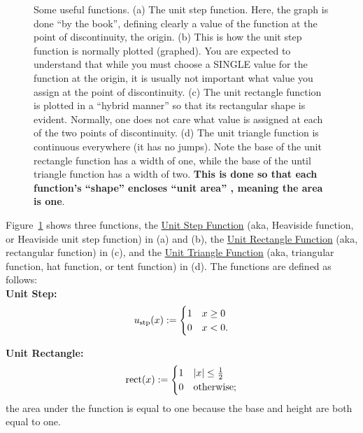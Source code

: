 \begin{figure}[htb!]
\caption[]{Some useful functions. (a) The unit step function. Here, the graph is done ``by the book'', defining clearly a value of the function at the point of discontinuity, the origin. (b) This is how the unit step function is normally plotted (graphed). You are expected to understand that while you must choose a SINGLE value for the function at the origin, it is usually not important what value you assign at the point of discontinuity. (c) The unit rectangle function is plotted in a ``hybrid manner'' so that its rectangular shape is evident. Normally, one does not care what value is assigned at each of the two points of discontinuity. (d) The unit triangle function is continuous everywhere (it has no jumps). Note the base of the unit rectangle function has a width of one, while the base of the until triangle function has a width of two. \textbf{This is done so that each function's ``shape'' encloses ``unit area'' , meaning the area is one}. }
    \label{fig:SpecialFunctions}
\end{figure}

Figure~\ref{fig:SpecialFunctions} shows three functions, the \href{https://en.wikipedia.org/wiki/Heaviside_step_function}{Unit Step Function} (aka, Heaviside function, or Heaviside unit step function) in (a) and (b), the \href{https://en.wikipedia.org/wiki/Rectangular_function}{Unit Rectangle Function} (aka, rectangular function) in (c), and the \href{https://en.wikipedia.org/wiki/Triangular_function#:~:text=References-,Triangular%20function,-14%20languages}{Unit Triangle Function} (aka, triangular function, hat function, or tent function)  in (d). The functions are defined as follows:\\

\textbf{Unit Step:}
\begin{equation}
    \label{eq:UnitStep}
    u_{\rm stp}(x):= \begin{cases} 1 & x \ge 0 \\
    0 & x < 0.        
    \end{cases}
\end{equation}

\textbf{Unit Rectangle:}
\begin{equation}
    \label{eq:UnitRectangle}
    {\rm rect}(x):= \begin{cases} 1 & |x| \le \frac{1}{2} \\
    0 & \text{otherwise};       
    \end{cases}
\end{equation}
the area under the function is equal to one because the base and height are both equal to one.

